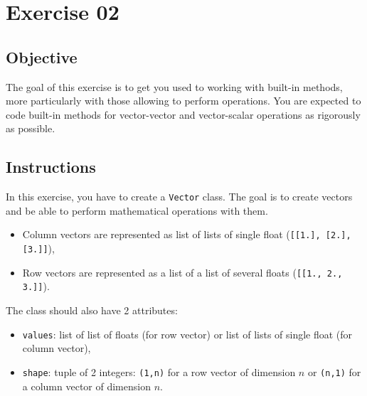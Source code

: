 \chapter{Exercise 02}
\makeheaderfilesforbidden

\section*{Objective}
The goal of this exercise is to get you used to working with built-in methods, more
particularly with those allowing to perform operations.
You are expected to code built-in methods for vector-vector and
vector-scalar operations as rigorously as possible.

\section*{Instructions}
In this exercise, you have to create a \texttt{Vector} class. The goal is to
create vectors and be able to perform mathematical operations with them.
\begin{itemize}
  \item Column vectors are represented as list of lists of single float (\texttt{[[1.], [2.], [3.]]}),
  \item Row vectors are represented as a list of a list of several floats (\texttt{[[1., 2., 3.]]}).
\end{itemize}



The class should also have 2 attributes:
\begin{itemize}
  \item \texttt{values}: list of list of floats (for row vector) or list of lists of single float (for column vector),
  \item \texttt{shape}: tuple of 2 integers: \texttt{(1,n)} for a row vector of dimension $n$
  or \texttt{(n,1)} for a column vector of dimension $n$. 
\end{itemize}

      
